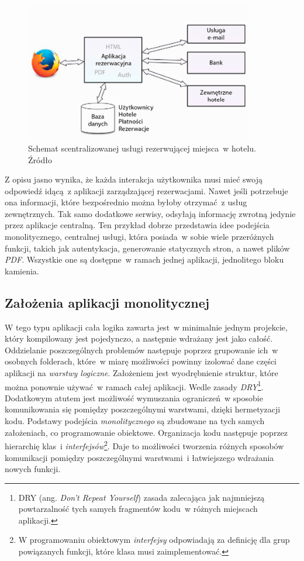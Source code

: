 \begin{figure}[h!]
	\centering
		\includegraphics[width=10cm]{Rysunki/Rozdzial1/scentralizowanaArchitektura.png}
		\caption{Schemat scentralizowanej usługi rezerwującej miejsca~w hotelu. Źródło \cite{Ziade:2018}}
		\label{fig:scentralizowanaArchitektura}
\end{figure}

Z opisu jasno wynika, że każda interakcja użytkownika musi mieć swoją odpowiedź idącą~z aplikacji zarządzającej rezerwacjami. Nawet jeśli potrzebuje ona informacji, które bezpośrednio można byłoby otrzymać~z usług zewnętrznych. Tak samo dodatkowe serwisy, odsyłają informację zwrotną jedynie przez aplikacje centralną. Ten przykład dobrze przedstawia idee podejścia monolitycznego, centralnej usługi, która posiada~w sobie wiele przeróżnych funkcji, takich jak autentykacja, generowanie statycznych stron, a nawet plików \textit{PDF}. Wszystkie one są dostępne~w ramach jednej aplikacji, jednolitego bloku kamienia.

\subsection{Założenia aplikacji monolitycznej}
W tego typu aplikacji cała logika zawarta jest~w minimalnie jednym projekcie, który kompilowany jest pojedynczo, a następnie wdrażany jest jako całość. Oddzielanie poszczególnych problemów następuje poprzez grupowanie ich~w osobnych folderach, które~w miarę możliwości powinny izolować dane części aplikacji na \textit{warstwy logiczne}\cite{msbuild}. Założeniem jest wyodrębnienie struktur, które można ponownie używać~w ramach całej aplikacji. Wedle zasady \textit{DRY}\footnote{DRY (ang. \textit{Don't Repeat Yourself}) zasada zalecająca jak najmniejszą powtarzalność tych samych fragmentów kodu~w różnych miejscach aplikacji\cite{hunt:2011}.}. Dodatkowym atutem jest możliwość wymuszania ograniczeń~w sposobie komunikowania się pomiędzy poszczególnymi warstwami, dzięki hermetyzacji kodu\cite{msbuild}. Podstawy podejścia \textit{monolitycznego} są zbudowane na tych samych założeniach, co programowanie obiektowe\cite{Rodger:2019}. Organizacja kodu następuje poprzez hierarchię klas~i \textit{interfejsów}\footnote{W programowaniu obiektowym \textit{interfejsy} odpowiadają za definicję dla grup powiązanych funkcji, które klasa musi zaimplementować\cite{msbuild}.}. Daje to możliwości tworzenia różnych sposobów komunikacji pomiędzy poszczególnymi warstwami~i łatwiejszego wdrażania nowych funkcji. 

